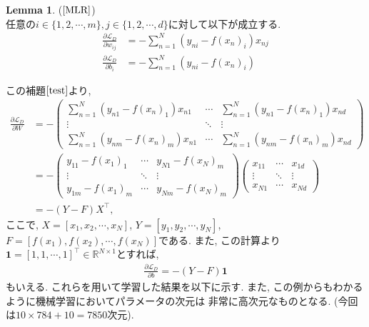 \documentclass[11pt, a4paper, dvipdfmx]{jsarticle}
\theoremstyle{definition}
\newtheorem{Lemma+}[Axiom+]{Lemma}
\newcommand{\R}{\mathbb{R}}
\newcommand{\Loss}{\mathcal{L}_{D}}
\begin{document}
\begin{Lemma+}($\cite{MLR}$)\\\label{test}
    任意の$i\in\{1, 2, \cdots, m\}, j\in\{1, 2, \cdots, d\}$に対して以下が成立する.
    \begin{align*}
        \frac{\partial\Loss}{\partial w_{ij}} &= -\sum_{n = 1}^{N}\left(y_{ni} - f(x_{n})_{i}\right)x_{nj}\\
        \frac{\partial\Loss}{\partial b_{i}} &= -\sum_{n = 1}^{N}(y_{ni} - f(x_{n})_{i})
    \end{align*}
\end{Lemma+}
この補題$\ref{test}$より, 
\begin{align*}
    \frac{\partial\Loss}{\partial W} &= - 
    \begin{pmatrix}
        \sum_{n = 1}^{N}\left(y_{n1} - f(x_{n})_{1}\right)x_{n1} & \cdots & \sum_{n = 1}^{N}\left(y_{n1} - f(x_{n})_{1}\right)x_{nd}\\
        \vdots & \ddots & \vdots\\
        \sum_{n = 1}^{N}\left(y_{nm} - f(x_{n})_{m}\right)x_{n1} & \cdots & \sum_{n = 1}^{N}\left(y_{nm} - f(x_{n})_{m}\right)x_{nd}
    \end{pmatrix}\\ 
    & = - 
    \begin{pmatrix}
        y_{11} - f(x_1)_1 & \cdots & y_{N1} - f(x_N)_m\\
        \vdots & \ddots & \vdots\\
        y_{1m} - f(x_1)_m & \cdots & y_{Nm} - f(x_N)_m
    \end{pmatrix}
    \begin{pmatrix}
        x_{11} & \cdots & x_{1d} \\
        \vdots & \ddots & \vdots \\
        x_{N1} & \cdots & x_{Nd}
    \end{pmatrix}\\
    &= -(Y - F)X^{\top},
\end{align*}
ここで, $X = [x_{1}, x_{2}, \cdots, x_{N}]$, $Y = [y_1, y_2, \cdots, y_N]$, $F = [f(x_1), f(x_2), \cdots, f(x_N)]$である. 
また, この計算より$\mathbf{1} = [1, 1, \cdots, 1]^{\top}\in\R^{N\times 1}$とすれば,
\begin{align*}
    \frac{\partial\Loss}{\partial b} = -(Y - F)\mathbf{1}
\end{align*}
もいえる. これらを用いて学習した結果を以下に示す. また, この例からもわかるように機械学習においてパラメータの次元は
非常に高次元なものとなる. (今回は$10\times784 + 10 = 7850$次元).
\end{document}
